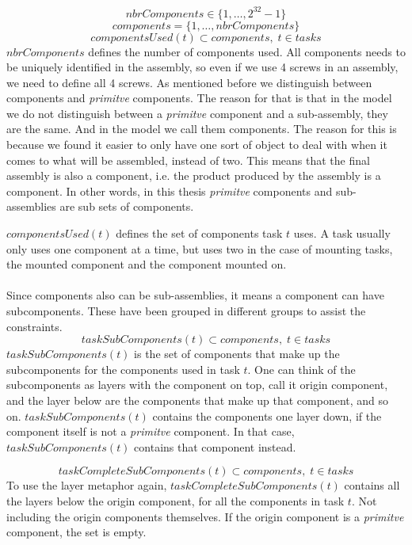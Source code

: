 \documentclass[10pt,a4paper]{report}
\begin{document}
\begin{equation}\label{eq:6}
nbrComponents \in \{1 , \ldots , 2^{32}-1\}
\end{equation}
\begin{equation}\label{eq:13}
components = \{1 , \ldots , nbrComponents\}
\end{equation}
\begin{equation}\label{eq:25}
componentsUsed(t) \subset components, \; t \in tasks
\end{equation}
$nbrComponents$ defines the number of components used. All components needs to be uniquely identified in the assembly, so even if we use 4 screws in an assembly, we need to define all 4 screws. As mentioned before we distinguish between components and \emph{primitve} components. The reason for that is that in the model we do not distinguish between a \emph{primitve} component and a sub-assembly, they are the same. And in the model we call them components. The reason for this is because we found it easier to only have one sort of object to deal with when it comes to what will be assembled, instead of two. This means that the final assembly is also a component, i.e. the product produced by the assembly is a component. In other words, in this thesis \emph{primitve} components and sub-assemblies are sub sets of components.

$componentsUsed(t)$ defines the set of components task $t$ uses. A task usually only uses one component at a time, but uses two in the case of mounting tasks, the mounted component and the component mounted on.
\\\\
Since components also can be sub-assemblies, it means a component can have subcomponents. These have been grouped in different groups to assist the constraints.
\begin{equation}\label{eq:53}
taskSubComponents(t) \subset components, \; t \in tasks\end{equation}
$taskSubComponents(t)$ is the set of components that make up the subcomponents for the components used in task $t$. One can think of the subcomponents as layers with the component on top, call it origin component, and the layer below are the components that make up that component, and so on. $taskSubComponents(t)$ contains the components one layer down, if the component itself is not a \emph{primitve} component. In that case, $taskSubComponents(t)$ contains that component instead.

\begin{equation}\label{eq:54}
taskCompleteSubComponents(t) \subset components, \; t \in tasks\end{equation}
To use the layer metaphor again, $taskCompleteSubComponents(t)$ contains all the layers below the origin component, for all the components in task $t$. Not including the origin components themselves. If the origin component is a \emph{primitve} component, the set is empty.
\end{document}
